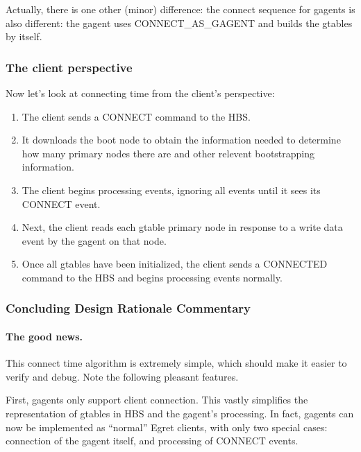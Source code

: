 Actually, there is one other (minor) difference: the connect sequence for
gagents is also different: the gagent uses CONNECT\_AS\_GAGENT and builds
the gtables by itself.


\subsubsection{The client perspective}

Now let's look at connecting time from the client's perspective:

\begin{enumerate}

\item The client sends a CONNECT command to the HBS.  
  
\item It downloads the boot node to obtain the information needed to
  determine how many primary nodes there are and other relevent
  bootstrapping information.
  
\item The client begins processing events, ignoring all events until it
  sees its CONNECT event.
  
\item Next, the client reads each gtable primary node in response to a
  write data event by the gagent on that node.
    
\item Once all gtables have been initialized, the client sends a
CONNECTED command to the HBS and begins processing events normally.

\end{enumerate}

\subsubsection{Concluding Design Rationale Commentary}

\paragraph {The good news.}
This connect time algorithm is extremely simple, which should make it
easier to verify and debug. Note the following pleasant features.

First, gagents only support client connection.  This vastly simplifies the
representation of gtables in HBS and the gagent's processing.  In fact,
gagents can now be implemented as ``normal'' Egret clients, with only two
special cases: connection of the gagent itself, and processing of CONNECT
events.

